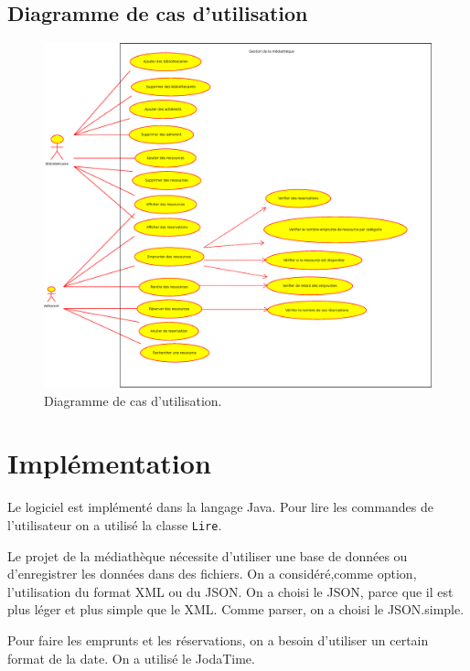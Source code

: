\documentclass[10pt, a4paper]{article}
\begin{document}
    		 \subsection{Diagramme de cas d'utilisation}
    		 
    		 \begin{figure}[h]
			\begin{center}
				\includegraphics[width=1\textwidth]{graphics/usecasediagram.eps}
				\caption{Diagramme de cas d'utilisation.}
			\end{center}
		\end{figure}
	
	\section{Implémentation}
	
	Le logiciel est implémenté dans la langage Java. Pour lire les commandes de l'utilisateur on a utilisé 
	la classe \texttt{Lire}.
	
	Le projet de la médiathèque nécessite d'utiliser une base de données ou d'enregistrer les données dans des
	fichiers.
	On a considéré,comme option, l'utilisation du format XML ou du JSON. On a choisi le JSON, parce que il est plus léger et plus
	simple que le XML. Comme parser, on a choisi le JSON.simple.
	
	Pour faire les emprunts et les réservations, on a besoin d'utiliser un certain format de la date. On a utilisé le
	JodaTime.
	
\end{document}
